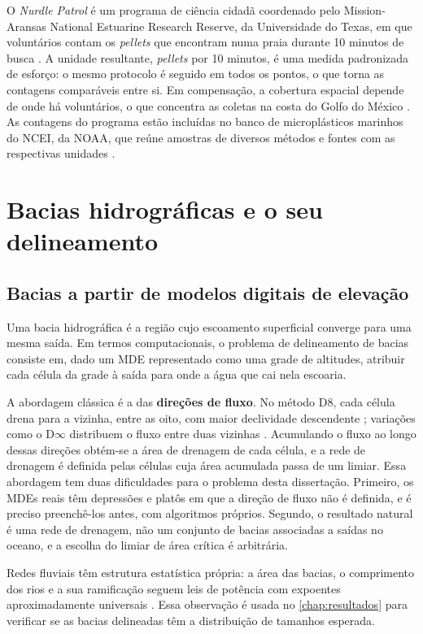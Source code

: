 O \textit{Nurdle Patrol} é um programa de ciência cidadã coordenado pelo Mission-Aransas National Estuarine Research Reserve, da Universidade do Texas, em que voluntários contam os \textit{pellets} que encontram numa praia durante 10 minutos de busca \cite{tunnell2020}. A unidade resultante, \textit{pellets} por 10 minutos, é uma medida padronizada de esforço: o mesmo protocolo é seguido em todos os pontos, o que torna as contagens comparáveis entre si. Em compensação, a cobertura espacial depende de onde há voluntários, o que concentra as coletas na costa do Golfo do México \cite{tunnell2020}. As contagens do programa estão incluídas no banco de microplásticos marinhos do \gls{NCEI}, da NOAA, que reúne amostras de diversos métodos e fontes com as respectivas unidades \cite{nyadjro2023}.

\section{Bacias hidrográficas e o seu delineamento}
\label{sec:bacias}

\subsection{Bacias a partir de modelos digitais de elevação}

Uma bacia hidrográfica é a região cujo escoamento superficial converge para uma mesma saída. Em termos computacionais, o problema de delineamento de bacias consiste em, dado um \gls{MDE} representado como uma grade de altitudes, atribuir cada célula da grade à saída para onde a água que cai nela escoaria.

A abordagem clássica é a das \textbf{direções de fluxo}. No método D8, cada célula drena para a vizinha, entre as oito, com maior declividade descendente \cite{ocallaghan1984}; variações como o D$\infty$ distribuem o fluxo entre duas vizinhas \cite{tarboton1997}. Acumulando o fluxo ao longo dessas direções obtém-se a área de drenagem de cada célula, e a rede de drenagem é definida pelas células cuja área acumulada passa de um limiar. Essa abordagem tem duas dificuldades para o problema desta dissertação. Primeiro, os MDEs reais têm depressões e platôs em que a direção de fluxo não é definida, e é preciso preenchê-los antes, com algoritmos próprios. Segundo, o resultado natural é uma rede de drenagem, não um conjunto de bacias associadas a saídas no oceano, e a escolha do limiar de área crítica é arbitrária.

Redes fluviais têm estrutura estatística própria: a área das bacias, o comprimento dos rios e a sua ramificação seguem leis de potência com expoentes aproximadamente universais \cite{rodrigueziturbe1997,maritan1996}. Essa observação é usada no \autoref{chap:resultados} para verificar se as bacias delineadas têm a distribuição de tamanhos esperada.

